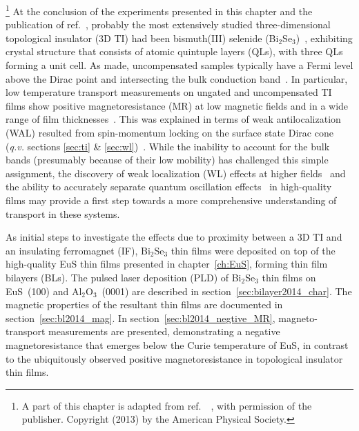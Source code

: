 \footnote[2]{A part of this chapter is adapted from ref.~\cite{bilayer2014}~, with permission of the publisher. Copyright (2013) by the American Physical Society.}%
%
At the conclusion of the experiments presented in this chapter and the publication of ref.~\cite{bilayer2014}, probably the most extensively studied three-dimensional topological insulator (3D TI) had been bismuth(III) selenide (Bi$_2$Se$_3$)~\cite{TI_electronic_structure_zhang, Zhanybek3, TI_other1}, exhibiting crystal structure that consists of atomic quintuple layers (QLs), with three QLs forming a unit cell. As made, uncompensated samples typically have a Fermi level above the Dirac point and intersecting the bulk conduction band~\cite{TI_ARPES1, ARPES_thickness}. In particular, low temperature transport measurements on ungated and uncompensated TI films show positive magnetoresistance (MR) at low magnetic fields and in a wide range of film thicknesses~\cite{ TI_WAL_Hongkong, TI_WAL_thickness, zhangli2012}. This was explained in terms of weak antilocalization (WAL) resulted from spin-momentum locking on the surface state Dirac cone (\textit{q.v.} sections \ref{sec:ti} \& \ref{sec:wl})~\cite{TI_WAL_Hongkong, bergmann1984}. While the inability to account for the bulk bands (presumably because of their low mobility) has challenged this simple assignment, the discovery of weak localization (WL) effects at higher fields~\cite{zhangli2013} and the ability to accurately separate quantum oscillation effects~\cite{Ando_PRL} in high-quality films may provide a first step towards a more comprehensive understanding of transport in these systems.

As initial steps to investigate the effects due to proximity between a 3D TI and an insulating ferromagnet (IF), Bi$_2$Se$_3$ thin films were deposited on top of the high-quality EuS thin films presented in chapter~\ref{ch:EuS}, forming thin film bilayers (BLs). The pulsed laser deposition (PLD) of Bi$_2$Se$_3$ thin films on EuS~(100) and Al$_2$O$_3$~(0001) are described in section~\ref{sec:bilayer2014_char}. The magnetic properties of the resultant thin films are documented in section~\ref{sec:bl2014_mag}. In section~\ref{sec:bl2014_negtive_MR}, magneto-transport measurements are presented, demonstrating a negative magnetoresistance that emerges below the Curie temperature of EuS, in contrast to the ubiquitously observed positive magnetoresistance in topological insulator thin films.

